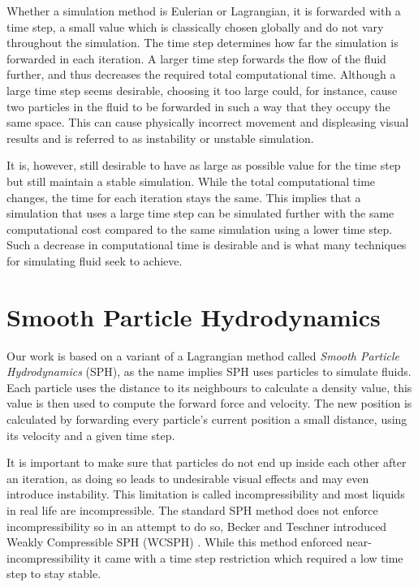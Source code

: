 \documentclass[../../main.tex]{subfiles}
\begin{document}
Whether a simulation method is Eulerian or Lagrangian, it is forwarded with a time step, a small value which is classically chosen globally and do not vary throughout the simulation. The time step determines how far the simulation is forwarded in each iteration. A larger time step forwards the flow of the fluid further, and thus decreases the required total computational time. Although a large time step seems desirable, choosing it too large could, for instance, cause two particles in the fluid to be forwarded in such a way that they occupy the same space. This can cause physically incorrect movement and displeasing visual results and is referred to as instability or unstable simulation.

It is, however, still desirable to have as large as possible value for the time step but still maintain a stable simulation. While the total computational time changes, the time for each iteration stays the same. This implies that a simulation that uses a large time step can be simulated further with the same computational cost compared to the same simulation using a lower time step. Such a decrease in computational time is desirable and is what many techniques for simulating fluid seek to achieve.


\section{Smooth Particle Hydrodynamics}
Our work is based on a variant of a Lagrangian method called \textit{Smooth Particle Hydrodynamics} (SPH), as the name implies SPH uses particles to simulate fluids. Each particle uses the distance to its neighbours to calculate a density value, this value is then used to compute the forward force and velocity. The new position is calculated by forwarding every particle's current position a small distance, using its velocity and a given time step. 


It is important to make sure that particles do not end up inside each other after an iteration, as doing so leads to undesirable visual effects and may even introduce instability. This limitation is called incompressibility and most liquids in real life are incompressible. The standard SPH method \citep{lucy1977numerical} does not enforce incompressibility so in an attempt to do so, Becker and Teschner introduced Weakly Compressible SPH (WCSPH) \citep{becker2007weakly}. While this method enforced near-incompressibility it came with a time step restriction which required a low time step to stay stable.
\end{document}
